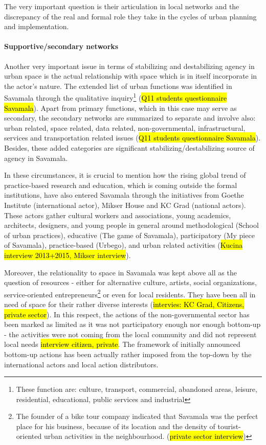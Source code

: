 \documentclass[11pt]{report}
\begin{document}
The very important question is their articulation in local networks and the discrepancy of the real and formal role they take in the cycles of urban planning and implementation.

\paragraph{Supportive/secondary networks}

Another very important issue in terms of stabilizing and destabilizing agency in urban space is the actual relationship with space which is in itself incorporate in the actor's nature.
The extended list of urban functions was identified in Savamala through the qualitative inquiry\footnote{These function are: culture, transport, commercial, abandoned areas, leisure, residential, educational, public services and industrial}
(\hl{Q11 students questionnaire Savamala}).
Apart from primary functions, which in this case may serve as secondary, the secondary networks are summarized to separate and involve also: urban related, space related, data related, non-governmental, infrastructural, services and transportation related issues (\hl{Q11 students questionnaire Savamala}).
Besides, these added categories are significant stabilizing/destabilizing source of agency in Savamala.

In these circumstances, it is crucial to mention how the rising global trend of practice-based research and education, which is coming outside the formal institutions, have also entered Savamala through the initiatives from Goethe Institute (international actor), Mikser House and KC Grad (national actors). These actors gather cultural workers and associations, young academics, architects, designers, and young people in general around methodological (School of urban practices), educative (The game of Savamala), participatory (My piece of Savamala), practice-based (Urbego), and urban related activities (\hl{Kucina interview 2013+2015, Mikser interview}).

Moreover, the relationality to space in Savamala was kept above all as the question of resources - either for alternative culture, artists, social organizations, service-oriented entrepreneurs\footnote{The founder of a bike tour company indicated that Savamala was the perfect place for his business, because of its location and the density of tourist-oriented urban activities in the neighbourhood. (\hl{private sector interview})}
or even for local residents.
They have been all in need of space for their rather diverse interests (\hl{intervies: KC Grad, Citizens, private sector}).
In this respect, the actions of the non-governmental sector has been marked as limited as it was not  participatory enough nor enough bottom-up - the activities were not coming from the local community and did not represent local needs \hl{interview citizen, private}.
The framework of initially announced bottom-up actions has been actually rather imposed from the top-down by the international actors and local action distributors.
\end{document}
